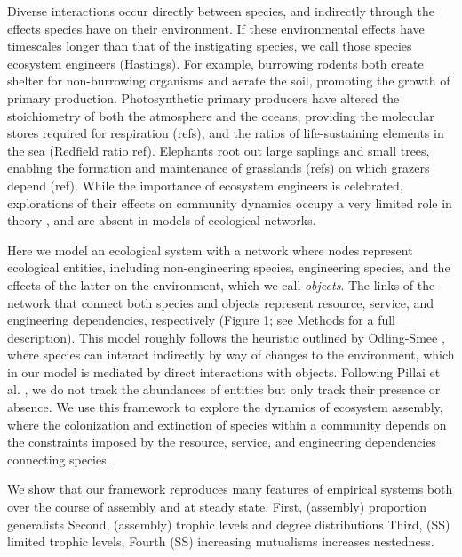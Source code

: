 \documentclass[9pt,twocolumn,twoside]{pnas-new}
\begin{document}
Diverse interactions occur directly between species, and indirectly through the effects species have on their environment.
If these environmental effects have timescales longer than that of the instigating species, we call those species ecosystem engineers (Hastings).
For example, burrowing rodents both create shelter for non-burrowing organisms and aerate the soil, promoting the growth of primary production.
Photosynthetic primary producers have altered the stoichiometry of both the atmosphere and the oceans, providing the molecular stores required for respiration (refs), and the ratios of life-sustaining elements in the sea (Redfield ratio ref).
Elephants root out large saplings and small trees, enabling the formation and maintenance of grasslands (refs) on which grazers depend (ref).
While the importance of ecosystem engineers is celebrated, explorations of their effects on community dynamics occupy a very limited role in theory \cite{Hastings2007,OdlingSmee2013}, and are absent in models of ecological networks.

Here we model an ecological system with a network where nodes represent ecological entities, including non-engineering species, engineering species, and the effects of the latter on the environment, which we call \emph{objects}.
The links of the network that connect both species and objects represent resource, service, and engineering dependencies, respectively (Figure 1; see Methods for a full description).
This model roughly follows the heuristic outlined by Odling-Smee \cite{OdlingSmee2013}, where species can interact indirectly by way of changes to the environment, which in our model is mediated by direct interactions with objects.
Following Pillai et al. \cite{Pillai2011}, we do not track the abundances of entities but only track their presence or absence.
We use this framework to explore the dynamics of ecosystem assembly, where the colonization and extinction of species within a community depends on the constraints imposed by the resource, service, and engineering dependencies connecting species.


We show that our framework reproduces many features of empirical systems both over the course of assembly and at steady state.
First, (assembly) proportion generalists
Second, (assembly) trophic levels and degree distributions
Third, (SS) limited trophic levels,
Fourth (SS) increasing mutualisms increases nestedness.
\end{document}
